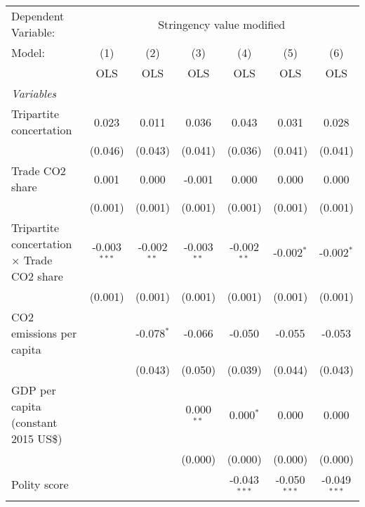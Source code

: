 
\begingroup
\centering
\begin{tabular}{lcccccc}
   \toprule
   Dependent Variable: & \multicolumn{6}{c}{Stringency value modified}\\
   Model:                                            & (1)            & (2)           & (3)           & (4)            & (5)            & (6)\\  
                                                     &  OLS           & OLS           & OLS           & OLS            & OLS            & OLS\\  
   \midrule
   \emph{Variables}\\
   Tripartite concertation                           & 0.023          & 0.011         & 0.036         & 0.043          & 0.031          & 0.028\\   
                                                     & (0.046)        & (0.043)       & (0.041)       & (0.036)        & (0.041)        & (0.041)\\   
   Trade CO2 share                                   & 0.001          & 0.000         & -0.001        & 0.000          & 0.000          & 0.000\\   
                                                     & (0.001)        & (0.001)       & (0.001)       & (0.001)        & (0.001)        & (0.001)\\   
   Tripartite concertation $\times$ Trade CO2 share  & -0.003$^{***}$ & -0.002$^{**}$ & -0.003$^{**}$ & -0.002$^{**}$  & -0.002$^{*}$   & -0.002$^{*}$\\   
                                                     & (0.001)        & (0.001)       & (0.001)       & (0.001)        & (0.001)        & (0.001)\\   
   CO2 emissions per capita                          &                & -0.078$^{*}$  & -0.066        & -0.050         & -0.055         & -0.053\\   
                                                     &                & (0.043)       & (0.050)       & (0.039)        & (0.044)        & (0.043)\\   
   GDP per capita (constant 2015 US\$)               &                &               & 0.000$^{**}$  & 0.000$^{*}$    & 0.000          & 0.000\\   
                                                     &                &               & (0.000)       & (0.000)        & (0.000)        & (0.000)\\   
   Polity score                                      &                &               &               & -0.043$^{***}$ & -0.050$^{***}$ & -0.049$^{***}$\\   

\end{tabular}
